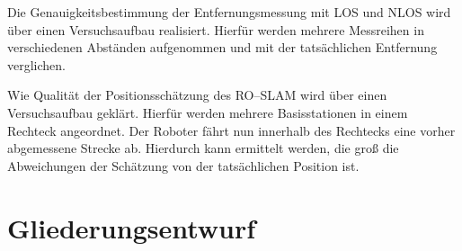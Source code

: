 \documentclass[12pt]{article}
\begin{document}
Die Genauigkeitsbestimmung der Entfernungsmessung mit LOS und NLOS wird über einen Versuchsaufbau realisiert. Hierfür werden mehrere Messreihen in verschiedenen Abständen aufgenommen und mit der tatsächlichen Entfernung verglichen.

Wie Qualität der Positionsschätzung des RO--SLAM wird über einen Versuchsaufbau geklärt. Hierfür werden mehrere Basisstationen in einem Rechteck angeordnet. Der Roboter fährt nun innerhalb des Rechtecks eine vorher abgemessene Strecke ab. Hierdurch kann ermittelt werden, die groß die Abweichungen der Schätzung von der tatsächlichen Position ist.


%
%
\section{Gliederungsentwurf}
\end{document}

